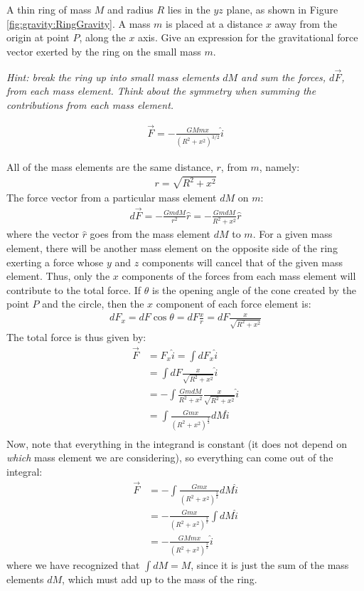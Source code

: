 \question A thin ring of mass $M$ and radius $R$ lies in the $yz$ plane, as shown in Figure \ref{fig:gravity:RingGravity}. A mass $m$ is placed at a distance $x$ away from the origin at point $P$, along the $x$ axis. Give an expression for the gravitational force vector exerted by the ring on the small mass $m$. 

\textit{Hint: break the ring up into small mass elements $dM$ and sum the forces, $d\vec F$, from each mass element. Think about the symmetry when summing the contributions from each mass element.}
\begin{finalanswer}
\begin{align*}
\vec F=-\frac{GMmx}{(R^2+x^2)^{3/2}}\hat i
\end{align*}
\end{finalanswer}
\begin{solution}
All of the mass elements are the same distance, $r$, from $m$, namely:
\begin{align*}
r = \sqrt{R^2+x^2}
\end{align*}
The force vector from a particular mass element $dM$ on $m$:
\begin{align*}
d\vec F=-\frac{GmdM}{r^2}\hat r=-\frac{GmdM}{R^2+x^2}\hat r
\end{align*}
where the vector $\hat r$ goes from the mass element $dM$ to $m$. For a given mass element, there will be another mass element on the opposite side of the ring exerting a force whose $y$ and $z$ components will cancel that of the given mass element. Thus, only the $x$ components of the forces from each mass element will contribute to the total force. If $\theta$ is the opening angle of the cone created by the point $P$ and the circle, then the $x$ component of each force element is:
\begin{align*}
dF_x=dF\cos\theta=dF\frac{x}{r}=dF\frac{x}{\sqrt{R^2+x^2}}
\end{align*}
The total force is thus given by:
\begin{align*}
\vec F&=F_x\hat i=\int dF_x \hat i \\
&=\int dF\frac{x}{\sqrt{R^2+x^2}} \hat i\\
&=-\int \frac{GmdM}{R^2+x^2}\frac{x}{\sqrt{R^2+x^2}} \hat i\\
&=\int \frac{Gmx}{(R^2+x^2)^{\frac{3}{2}}}dM \hat i\\
\end{align*}
Now, note that everything in the integrand is constant (it does not depend on \textit{which} mass element we are considering), so everything can come out of the integral:
\begin{align*}
\vec F&=-\int \frac{Gmx}{(R^2+x^2)^{\frac{3}{2}}}dM \hat i\\
&=-\frac{Gmx}{(R^2+x^2)^{\frac{3}{2}}}\int dM \hat i\\
&=-\frac{GMmx}{(R^2+x^2)^{\frac{3}{2}}}\hat i
\end{align*}
where we have recognized that $\int dM=M$, since it is just the sum of the mass elements $dM$, which must add up to the mass of the ring.
\end{solution}

